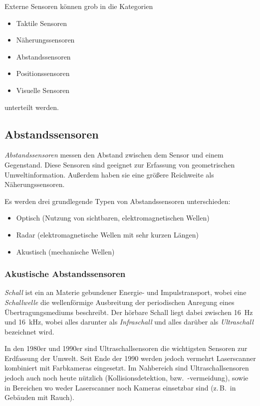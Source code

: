 \documentclass[a4paper, 11pt, accentcolor = tud3b]{tudreport}
\newcommand{\bzw}{bzw.~}
\newcommand{\zB}{z.\,B.~}
\begin{document}
			Externe Sensoren können grob in die Kategorien
			\begin{itemize}
				\item Taktile Sensoren
				\item Näherungssensoren
				\item Abstandssensoren
				\item Positionssensoren
				\item Visuelle Sensoren
			\end{itemize}
			unterteilt werden.

			\subsection{Abstandssensoren}
				\emph{Abstandssensoren} messen den Abstand zwischen dem Sensor und einem Gegenstand. Diese Sensoren sind geeignet zur Erfassung von geometrischen Umweltinformation. Außerdem haben sie eine größere Reichweite als Näherungssensoren.
				
				Es werden drei grundlegende Typen von Abstandssensoren unterschieden:
				\begin{itemize}
					\item Optisch (Nutzung von sichtbaren, elektromagnetischen Wellen)
					\item Radar (elektromagnetische Wellen mit sehr kurzen Längen)
					\item Akustisch (mechanische Wellen)
				\end{itemize}

				\subsubsection{Akustische Abstandssensoren}
					\emph{Schall} ist ein an Materie gebundener Energie- und Impulstransport, wobei eine \emph{Schallwelle} die wellenförmige Ausbreitung der periodischen Anregung eines Übertragungsmediums beschreibt. Der hörbare Schall liegt dabei zwischen \SI{16}{\hertz} und \SI{16}{\kilo\hertz}, wobei alles darunter als \emph{Infraschall} und alles darüber als \emph{Ultraschall} bezeichnet wird.
					
					In den 1980er und 1990er sind Ultraschallsensoren die wichtigsten Sensoren zur Erdfassung der Umwelt. Seit Ende der 1990 werden jedoch vermehrt Laserscanner kombiniert mit Farbkameras eingesetzt. Im Nahbereich sind Ultraschallsensoren jedoch auch noch heute nützlich (Kollisionsdetektion, \bzw -vermeidung), sowie in Bereichen wo weder Laserscanner noch Kameras einsetzbar sind (\zB in Gebäuden mit Rauch).
\end{document}
